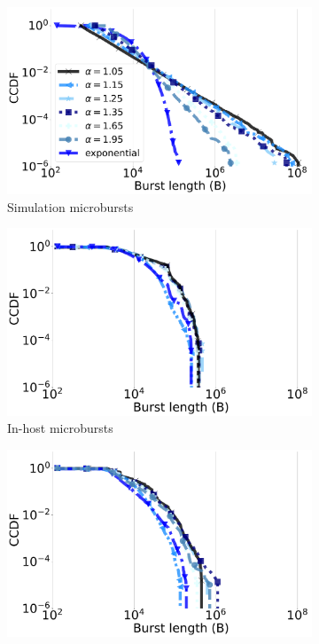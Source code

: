 \begin{figure}[t]
\centering
\begin{subfigure}[t]{0.32\linewidth}
    \centering
    \includegraphics[width=1\linewidth]{figs/fileccdf_sim.pdf}
    \caption{Simulation microbursts}
	\label{fig:filecdf-sim}
\end{subfigure}
\begin{subfigure}[t]{0.32\linewidth}
    \centering
    \includegraphics[width=1\linewidth]{figs/fileccdf_ebpf_testbed.pdf}
    \caption{In-host microbursts}
	\label{fig:fccdf-ebpf}
\end{subfigure}
\begin{subfigure}[t]{0.32\linewidth}
    \centering
    	\includegraphics[width=1\linewidth]{figs/fileccdf_testbed.pdf}

\end{subfigure}
\end{figure}
